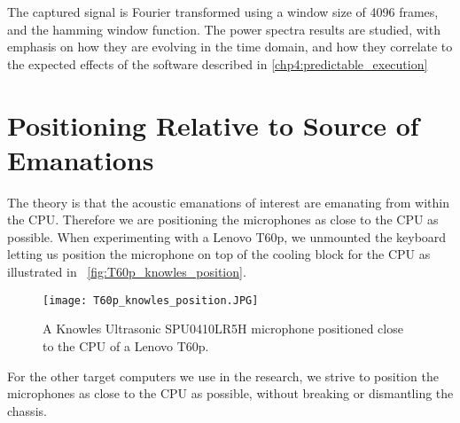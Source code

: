The captured signal is Fourier transformed using a window size of 4096 frames, and the hamming window function. The power spectra results are studied, with emphasis on how they are evolving in the time domain, and how they correlate to the expected effects of the software described in \autoref{chp4:predictable_execution}

\section{Positioning Relative to Source of Emanations}\label{chp3:sec:capturing_audio_fingerprint}
The theory is that the acoustic emanations of interest are emanating from within the CPU.
Therefore we are positioning the microphones as close to the CPU as possible. 
When experimenting with a Lenovo T60p, we unmounted the keyboard letting us position the microphone on top of the cooling block for the CPU as illustrated in ~\autoref{fig:T60p_knowles_position}. 

\begin{figure}[ht]
  \centering
  \texttt{[image: T60p\_knowles\_position.JPG]}
  \caption{A Knowles Ultrasonic SPU0410LR5H microphone positioned close to the CPU of a Lenovo T60p.}
  \label{fig:T60p_knowles_position}
\end{figure}

For the other target computers we use in the research, we strive to position the microphones as close to the CPU as possible, without breaking or dismantling the chassis.
